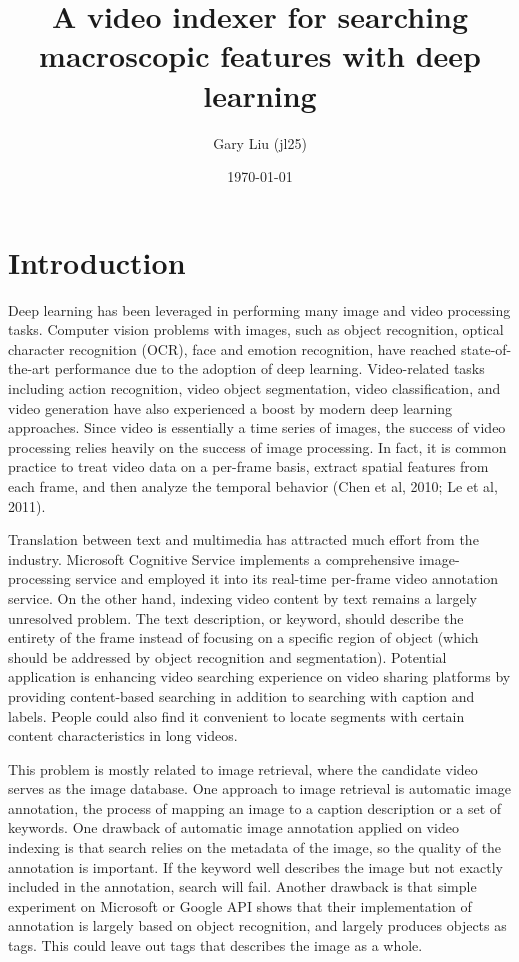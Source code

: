 \documentclass{article}
\title{A video indexer for searching macroscopic features with deep learning}
\author{Gary Liu (jl25)}
\date{\today}
\begin{document}
\maketitle

\section{Introduction}

Deep learning has been leveraged in performing many image and video processing tasks. Computer vision problems with images, such as object recognition, optical character recognition (OCR), face and emotion recognition, have reached state-of-the-art performance due to the adoption of deep learning. Video-related tasks including action recognition, video object segmentation, video classification, and video generation have also experienced a boost by modern deep learning approaches. Since video is essentially a time series of images, the success of video processing relies heavily on the success of image processing. In fact, it is common practice to treat video data on a per-frame basis, extract spatial features from each frame, and then analyze the temporal behavior (Chen et al, 2010; Le et al, 2011). 

Translation between text and multimedia has attracted much effort from the industry. Microsoft Cognitive Service implements a comprehensive image-processing service and employed it into its real-time per-frame video annotation service. On the other hand, indexing video content by text remains a largely unresolved problem. The text description, or keyword, should describe the entirety of the frame instead of focusing on a specific region of object (which should be addressed by object recognition and segmentation). Potential application is enhancing video searching experience on video sharing platforms by providing content-based searching in addition to searching with caption and labels. People could also find it convenient to locate segments with certain content characteristics in long videos. 

This problem is mostly related to image retrieval, where the candidate video serves as the image database. One approach to image retrieval is automatic image annotation, the process of mapping an image to a caption description or a set of keywords. One drawback of automatic image annotation applied on video indexing is that search relies on the metadata of the image, so the quality of the annotation is important. If the keyword well describes the image but not exactly included in the annotation, search will fail. Another drawback is that simple experiment on Microsoft or Google API shows that their implementation of annotation is largely based on object recognition, and largely produces objects as tags. This could leave out tags that describes the image as a whole. 
\end{document}
